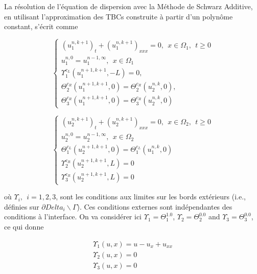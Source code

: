 \indent La résolution de l'équation de dispersion avec la Méthode de Schwarz Additive, en utilisant l'approximation des TBCs construite à partir d'un polynôme constant, s'écrit comme

\begin{equation}
    \label{eq:problemDDM1}
    \begin{cases}
        (u_1^{n,k+1})_t + (u_1^{n,k+1})_{xxx} = 0 , \ \ x \in \Omega_1, \ \ t \geq 0\\
        u_1^{n,0} = u_1^{n-1,\infty} , \ \ x \in \Omega_1 \\
        \Upsilon_1^{c_L}(u_1^{n+1,k+1},-L) = 0, \\ 
        \Theta_2^{c_R}(u_1^{n+1,k+1},0) = \Theta_2^{c_R}(u_2^{n,k},0) , \\
        \Theta_3^{c_R}(u_1^{n+1,k+1},0) = \Theta_3^{c_R}(u_2^{n,k},0)
     \end{cases}
\end{equation}

\begin{equation}
    \label{eq:problemDDM2}
    \begin{cases}
        (u_2^{n,k+1})_t + (u_2^{n,k+1})_{xxx} = 0 , \ \ x \in \Omega_2, \ \ t \geq 0\\
        u_2^{n,0} = u_2^{n-1,\infty} , \ \ x \in \Omega_2 \\
        \Theta_1^{c_L}(u_2^{n+1,k+1},0) = \Theta_1^{c_L}(u_1^{n,k},0) \\
        \Upsilon_2^{c_R}(u_2^{n+1,k+1},L) = 0 \\
        \Upsilon_3^{c_R}(u_2^{n+1,k+1},L) = 0
     \end{cases}
\end{equation}

\noindent où $ \Upsilon_i, \ \ i=1,2,3$,  sont les conditions aux limites sur les bords extérieurs (i.e., définies sur $\partial Delta_i \backslash \Gamma$). Ces conditions externes sont indépendantes des conditions à l'interface. On va considérer ici $\Upsilon_1 = \Theta_1^{1.0}$, $\Upsilon_2 = \Theta_2^{0.0}$ and $\Upsilon_3 = \Theta_3^{0.0}$, ce qui donne 

\begin{equation}
\label{eq:externalBCsDDM}
\begin{gathered}
	\Upsilon_1(u,x) = u - u_x + u_{xx} \\
	\Upsilon_2(u,x) = 0 \\
	\Upsilon_3(u,x) = 0
\end{gathered}
\end{equation}


